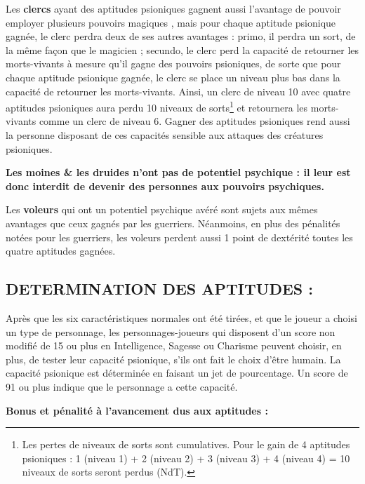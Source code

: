 \documentclass[11pt]{article}
\begin{document}
{\bigskip

Les \textbf{clercs} ayant des aptitudes psioniques gagnent aussi l'avantage de pouvoir employer plusieurs pouvoirs \og magiques \fg{}, mais pour chaque aptitude psionique gagnée, le clerc perdra deux de ses autres avantages : primo, il perdra un sort, de la même façon que le magicien ; secundo, le clerc perd la capacité de retourner les morts-vivants à mesure qu'il gagne des pouvoirs  psioniques, de sorte que pour chaque aptitude psionique gagnée, le clerc se place un niveau plus bas dans la capacité de retourner les morts-vivants. Ainsi, un clerc de niveau 10 avec quatre aptitudes psioniques aura perdu 10 niveaux de sorts\footnote{Les pertes de niveaux de sorts sont cumulatives. Pour le gain de 4 aptitudes psioniques : 1 (niveau 1) + 2 (niveau 2) + 3 (niveau 3) + 4 (niveau 4) = 10 niveaux de sorts seront perdus (NdT).} et retournera les morts-vivants comme un clerc de niveau 6. Gagner des aptitudes psioniques rend aussi la personne disposant de ces capacités sensible aux attaques des créatures psioniques.

\bigskip

\textbf{Les moines \& les druides n'ont pas de potentiel psychique : il leur est donc interdit de devenir des personnes aux pouvoirs psychiques.}

\bigskip

Les \textbf{voleurs} qui ont un potentiel psychique avéré sont sujets aux mêmes avantages que ceux gagnés par les guerriers. Néanmoins, en plus des pénalités notées pour les guerriers, les voleurs perdent aussi 1 point de dextérité toutes les quatre aptitudes gagnées.

\subsection*{{\normalsize DETERMINATION DES APTITUDES :}}

\medskip

Après que les six caractéristiques normales ont été tirées, et que le joueur a choisi un type de personnage, les personnages-joueurs qui disposent d'un score non modifié de 15 ou plus en Intelligence, Sagesse ou Charisme peuvent choisir, en plus, de tester leur capacité psionique, s'ils ont fait le choix d'être humain. La capacité psionique est déterminée en faisant un jet de pourcentage. Un score de 91 ou plus indique que le personnage a cette capacité.

\bigskip

\textbf{Bonus et pénalité à l'avancement dus aux aptitudes :}

}
\end{document}
